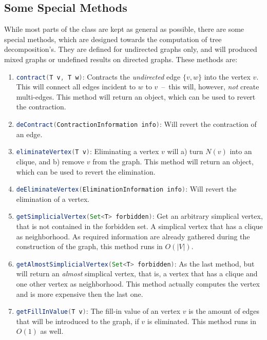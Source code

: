 \documentclass[a4paper, ukenglish, twoside, openright]{jdrasilmanual}
\begin{document}
\subsection{Some Special Methods}
While most parts of the  class are kept as general as
possible, there are some special methods, which are designed towards
the computation of tree decomposition's. They are defined for
\textcolor{jdrasil.fg}{undirected graphs} only, and will produced
mixed graphs or undefined results on directed graphs. These methods
are:
\begin{enumerate}
  \item\lstinline[language=Java]{contract(T v, T w)}: Contracts the
    \emph{undirected} edge $\{v,w\}$ into the vertex $v$. This will
    connect all edges incident to $w$ to $v$~–~this will, however,
    \emph{not} create multi-edges. This method will return an
     object, which can be used to
    revert the contraction.
 \item\lstinline[language=Java]{deContract(ContractionInformation info)}: Will revert the contraction of an edge.
  \item\lstinline[language=Java]{eliminateVertex(T v)}: Eliminating
    a vertex $v$ will a) turn $N(v)$ into an clique, and b) remove $v$
    from the graph. This method will return an
     object, which can be used to
    revert the elimination.
  \item\lstinline[language=Java]{deEliminateVertex(EliminationInformation info)}:
 Will revert the elimination of a vertex.
 \item\lstinline[language=Java]{getSimplicialVertex(Set<T> forbidden)}: Get an arbitrary simplical vertex, that is not
   contained in the forbidden set. A simplical vertex that has a
   clique as neighborhood. As required information are already
   gathered during the construction of the graph, this method runs in
   $O(|V|)$.
 \item\lstinline[language=Java]{getAlmostSimplicialVertex(Set<T> forbidden)}: As the last method, but will return an \emph{almost}
   simplical vertex, that is, a vertex that has a clique and one other
   vertex as neighborhood. This method actually computes the vertex
   and is more expensive then the last one.
 \item\lstinline[language=Java]{getFillInValue(T v)}: The fill-in
   value of an vertex $v$ is the amount of edges that will be
   introduced to the graph, if $v$ is eliminated. This method runs in
   $O(1)$ as well.
\end{enumerate}
\end{document}
